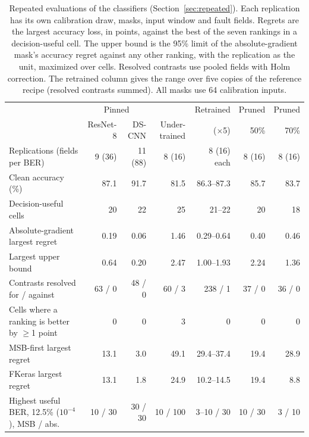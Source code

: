 \begin{table}[t]
\caption{Repeated evaluations of the classifiers (Section~\ref{sec:repeated}). Each replication has its own calibration draw, masks, input window and fault fields. Regrets are the largest accuracy loss, in points, against the best of the seven rankings in a decision-useful cell. The upper bound is the 95\% limit of the absolute-gradient mask's accuracy regret against any other ranking, with the replication as the unit, maximized over cells. Resolved contrasts use pooled fields with Holm correction. The retrained column gives the range over five copies of the reference recipe (resolved contrasts summed). All masks use 64 calibration inputs.}\label{tab:repeated}
\centering\footnotesize\setlength{\tabcolsep}{4pt}
\begin{tabular}{l r r r r r r}\toprule
 & \multicolumn{2}{c}{Pinned} & & Retrained & Pruned & Pruned \\
 & ResNet-8 & DS-CNN & Under-trained & ($\times$5) & 50\% & 70\%\\\midrule
Replications (fields per BER) & 9 (36) & 11 (88) & 8 (16) & 8 (16) each & 8 (16) & 8 (16)\\
Clean accuracy (\%) & 87.1 & 91.7 & 81.5 & 86.3--87.3 & 85.7 & 83.7\\
Decision-useful cells & 20 & 22 & 25 & 21--22 & 20 & 18\\
Absolute-gradient largest regret & 0.19 & 0.06 & 1.46 & 0.29--0.64 & 0.40 & 0.46\\
Largest upper bound & 0.64 & 0.20 & 2.47 & 1.00--1.93 & 2.24 & 1.36\\
Contrasts resolved for / against & 63 / 0 & 48 / 0 & 60 / 3 & 238 / 1 & 37 / 0 & 36 / 0\\
Cells where a ranking is better by $\ge$1 point & 0 & 0 & 3 & 0 & 0 & 0\\
MSB-first largest regret & 13.1 & 3.0 & 49.1 & 29.4--37.4 & 19.4 & 28.9\\
FKeras largest regret & 13.1 & 1.8 & 24.9 & 10.2--14.5 & 19.4 & 8.8\\
Highest useful BER, 12.5\% ($10^{-4}$), MSB / abs. & 10 / 30 & 30 / 30 & 10 / 100 & 3--10 / 30 & 10 / 30 & 3 / 10\\\bottomrule
\end{tabular}
\end{table}

